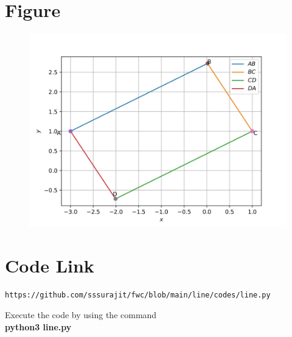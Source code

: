 \documentclass[journal,12pt,twocolumn]{IEEEtran}
\begin{document}
\section{\textbf{Figure}}
\begin{figure}[h]
    \centering
\includegraphics[width=\columnwidth]{fig.jpg}
    \label{fig:my_label}
\end{figure}


\section{\textbf{Code Link}}

\begin{lstlisting}
https://github.com/sssurajit/fwc/blob/main/line/codes/line.py
\end{lstlisting}
Execute the code by using the command\\
\textbf{python3 line.py}
\end{document}
